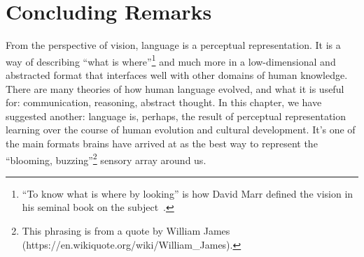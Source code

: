 






\section{Concluding Remarks}

From the perspective of vision, language is a perceptual representation. It is a way of describing ``what is where''\footnote{``To know what is where by looking'' is how David Marr defined the vision in his seminal book on the subject~\cite{Marr82}.} and much more in a low-dimensional and abstracted format that interfaces well with other domains of human knowledge. There are many theories of how human language evolved, and what it is useful for: communication, reasoning, abstract thought. In this chapter, we have suggested another: language is, perhaps, the result of perceptual representation learning over the course of human evolution and cultural development. It's one of the main formats brains have arrived at as the best way to represent the ``blooming, buzzing''\footnote{This phrasing is from a quote by William James (https://en.wikiquote.org/wiki/William\_James).} sensory array around us.
